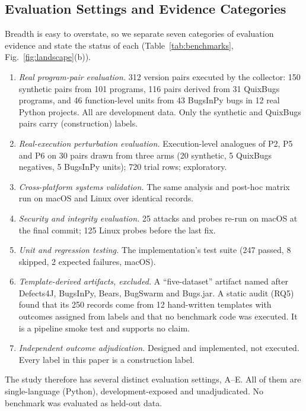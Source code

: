 \subsection{Evaluation Settings and Evidence Categories}
Breadth is easy to overstate, so we separate seven categories of evaluation evidence and state the status of each (Table~\ref{tab:benchmarks}, Fig.~\ref{fig:landscape}(b)).
\begin{enumerate}
\item[A)] \emph{Real program-pair evaluation.} 312 version pairs executed by the collector: 150 synthetic pairs from 101 programs, 116 pairs derived from 31 QuixBugs programs, and 46 function-level units from 43 BugsInPy bugs in 12 real Python projects. All are development data. Only the synthetic and QuixBugs pairs carry (construction) labels.
\item[B)] \emph{Real-execution perturbation evaluation.} Execution-level analogues of P2, P5 and P6 on 30 pairs drawn from three arms (20 synthetic, 5 QuixBugs negatives, 5 BugsInPy units); 720 trial rows; exploratory.
\item[C)] \emph{Cross-platform systems validation.} The same analysis and post-hoc \ers{} matrix run on macOS and Linux over identical records.
\item[D)] \emph{Security and integrity evaluation.} 25 attacks and probes re-run on macOS at the final commit; 125 Linux probes before the last fix.
\item[E)] \emph{Unit and regression testing.} The implementation's test suite (247 passed, 8 skipped, 2 expected failures, macOS).
\item[F)] \emph{Template-derived artifacts, excluded.} A ``five-dataset'' artifact named after Defects4J, BugsInPy, Bears, BugSwarm and Bugs.jar. A static audit (RQ5) found that its 250 records come from 12 hand-written templates with outcomes assigned from labels and that no benchmark code was executed. It is a pipeline smoke test and supports no claim.
\item[G)] \emph{Independent outcome adjudication.} Designed and implemented, not executed. Every label in this paper is a construction label.
\end{enumerate}
The study therefore has several distinct evaluation settings, A--E. All of them are single-language (Python), development-exposed and unadjudicated. No benchmark was evaluated as held-out data.

